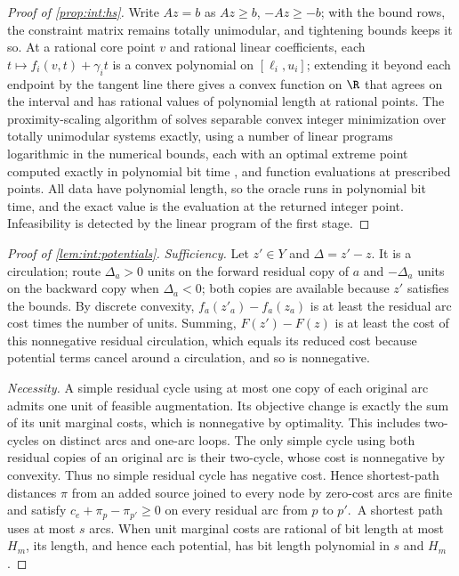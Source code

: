 \begin{proof}[Proof of \cref{prop:int:hs}]
Write $Az=b$ as $Az\ge b$, $-Az\ge-b$; with the bound rows, the constraint matrix
remains totally unimodular, and tightening bounds keeps it so. At a rational core
point $v$ and rational linear coefficients, each $t\mapsto f_i(v,t)+\gamma_it$ is
a convex polynomial on $[\ell_i,u_i]$; extending it beyond each endpoint by the
tangent line there gives a convex function on $\R$ that agrees on the interval and
has rational values of polynomial length at rational points. The proximity-scaling
algorithm of \citet[Algorithm~4.2 and Theorem~4.3]{hochbaum1990-convex-separable-optimization-is-not} solves
separable convex integer minimization over totally unimodular systems exactly,
using a number of linear programs logarithmic in the numerical bounds, each with an
optimal extreme point computed exactly in polynomial bit time
\citep{grotschel1988-geometric-algorithms-and-combinatorial-optimization}, and function evaluations at prescribed
points. All data have polynomial length, so the oracle runs in polynomial bit
time, and the exact value is the evaluation at the returned integer point.
Infeasibility is detected by the linear program of the first stage.
\end{proof}

\begin{proof}[Proof of \cref{lem:int:potentials}]
\emph{Sufficiency.} Let $z'\in Y$ and $\Delta=z'-z$. It is a circulation; route
$\Delta_a>0$ units on the forward residual copy of $a$ and $-\Delta_a$ units on the
backward copy when $\Delta_a<0$; both copies are available because $z'$ satisfies
the bounds. By discrete convexity, $f_a(z'_a)-f_a(z_a)$ is at least the residual
arc cost times the number of units. Summing, $F(z')-F(z)$ is at least the cost of
this nonnegative residual circulation, which equals its reduced cost because
potential terms cancel around a circulation, and so is nonnegative.

\emph{Necessity.} A simple residual cycle using at most one copy of each
original arc admits one unit of feasible augmentation. Its objective change
is exactly the sum of its unit marginal costs, which is nonnegative by
optimality. This includes two-cycles on distinct arcs and one-arc loops.
The only simple cycle using both residual copies of an original arc is
their two-cycle, whose cost is nonnegative by convexity. Thus no simple
residual cycle has negative cost. Hence
shortest-path distances $\pi$ from an added source joined to every node by zero-cost
arcs are finite and satisfy $c_e+\pi_p-\pi_{p'}\ge0$ on every residual arc from $p$
to $p'$. A shortest path uses at most $s$ arcs. When unit marginal costs are
rational of bit length at most $H_m$, its length, and hence each potential,
has bit length polynomial in $s$ and $H_m$.
\end{proof}

